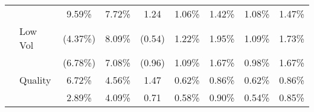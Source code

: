 \documentclass[12pt]{article}
\begin{document}
\begin{table}[H]
{\begin{tabular}{@{}llccccccc@{}}
                              &                   & {\color[HTML]{303498} 9.59\%}                                    & {\color[HTML]{303498} 7.72\%}                                        & {\color[HTML]{303498} 1.24}                            & {\color[HTML]{303498} 1.06\%}                                 & {\color[HTML]{303498} 1.42\%}                                & {\color[HTML]{303498} 1.08\%}                                 & {\color[HTML]{303498} 1.47\%}                               \\
                              & Low Vol           & (4.37\%)                                                         & 8.09\%                                                               & (0.54)                                                 & 1.22\%                                                        & 1.95\%                                                       & 1.09\%                                                        & 1.73\%                                                      \\
                              &                   & {\color[HTML]{303498} (6.78\%)}                                  & {\color[HTML]{303498} 7.08\%}                                        & {\color[HTML]{303498} (0.96)}                          & {\color[HTML]{303498} 1.09\%}                                 & {\color[HTML]{303498} 1.67\%}                                & {\color[HTML]{303498} 0.98\%}                                 & {\color[HTML]{303498} 1.67\%}                               \\
                              & Quality           & 6.72\%                                                           & 4.56\%                                                               & 1.47                                                   & 0.62\%                                                        & 0.86\%                                                       & 0.62\%                                                        & 0.86\%                                                      \\
                              &                   & {\color[HTML]{303498} 2.89\%}                                    & {\color[HTML]{303498} 4.09\%}                                        & {\color[HTML]{303498} 0.71}                            & {\color[HTML]{303498} 0.58\%}                                 & {\color[HTML]{303498} 0.90\%}                                & {\color[HTML]{303498} 0.54\%}                                 & {\color[HTML]{303498} 0.85\%}                               \\ \midrule

\end{tabular}}
\end{table}
\end{document}

